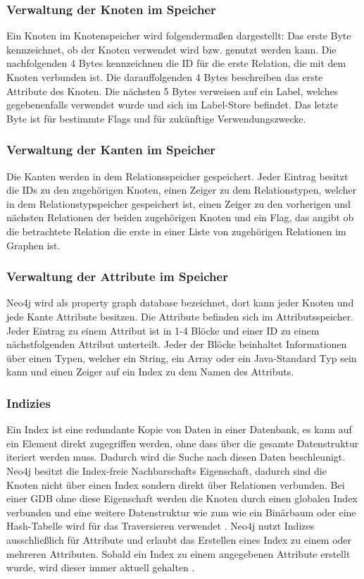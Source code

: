 \subsubsection{Verwaltung der Knoten im Speicher}
Ein Knoten im Knotenspeicher wird folgendermaßen dargestellt: Das erste Byte kennzeichnet, ob der Knoten verwendet wird bzw. genutzt werden kann. Die nachfolgenden 4 Bytes kennzeichnen die ID für die erste Relation, die mit dem Knoten verbunden ist. Die darauffolgenden 4 Bytes beschreiben das erste Attribute des Knoten. Die nächsten 5 Bytes verweisen auf ein Label, welches gegebenenfalls verwendet wurde und sich im Label-Store befindet. Das letzte Byte ist für bestimmte Flags und für zukünftige Verwendungszwecke. 
\subsubsection{Verwaltung der Kanten im Speicher}
Die Kanten werden in dem Relationsspeicher gespeichert. Jeder Eintrag besitzt die IDs zu den zugehörigen Knoten, einen Zeiger zu dem Relationstypen, welcher in dem Relationstypspeicher gespeichert ist, einen Zeiger zu den vorherigen und nächsten Relationen der beiden zugehörigen Knoten und ein Flag, das angibt ob die betrachtete Relation die erste in einer Liste von zugehörigen Relationen im Graphen ist. 
\subsubsection{Verwaltung der Attribute im Speicher}
Neo4j wird als property graph database bezeichnet, dort kann jeder Knoten und jede Kante Attribute besitzen. Die Attribute befinden sich im Attributsspeicher. Jeder Eintrag zu einem Attribut ist in 1-4 Blöcke und einer ID zu einem nächstfolgenden Attribut unterteilt. Jeder der Blöcke beinhaltet Informationen über einen Typen, welcher ein String, ein Array oder ein Java-Standard Typ sein kann und einen Zeiger auf ein Index zu dem Namen des Attributs.  
\subsubsection{Indizies}
Ein Index ist eine redundante Kopie von Daten in einer Datenbank, es kann auf ein Element direkt zugegriffen werden, ohne dass über die gesamte Datenstruktur iteriert werden muss. Dadurch wird die Suche nach diesen Daten beschleunigt. Neo4j besitzt die Index-freie Nachbarschafts Eigenschaft, dadurch sind die Knoten nicht über einen Index  sondern direkt über Relationen verbunden. Bei einer GDB ohne diese Eigenschaft werden die Knoten durch einen globalen Index verbunden und eine weitere Datenstruktur wie zum wie ein Binärbaum oder eine Hash-Tabelle wird für das Traversieren verwendet \parencite{robinson2013graph}. \newline
Neo4j nutzt Indizes ausschließlich für Attribute und erlaubt das Erstellen eines Index zu einem oder mehreren Attributen. Sobald ein Index zu einem angegebenen Attribute erstellt wurde, wird dieser immer aktuell gehalten \parencite{Index}.  	

